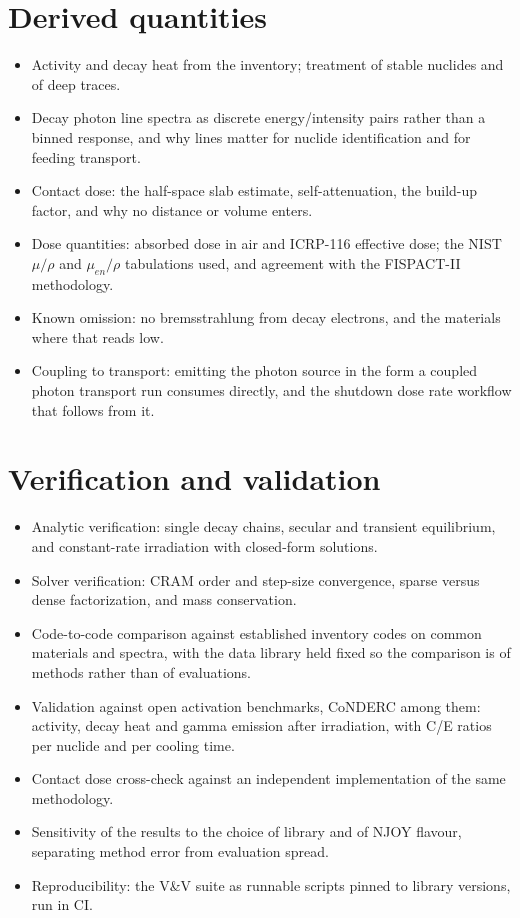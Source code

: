 \section{Derived quantities}
\begin{itemize}
  \item Activity and decay heat from the inventory; treatment of stable
        nuclides and of deep traces.
  \item Decay photon line spectra as discrete energy/intensity pairs rather
        than a binned response, and why lines matter for nuclide
        identification and for feeding transport.
  \item Contact dose: the half-space slab estimate, self-attenuation, the
        build-up factor, and why no distance or volume enters.
  \item Dose quantities: absorbed dose in air and ICRP-116 effective dose;
        the NIST $\mu/\rho$ and $\mu_{en}/\rho$ tabulations used, and
        agreement with the FISPACT-II methodology.
  \item Known omission: no bremsstrahlung from decay electrons, and the
        materials where that reads low.
  \item Coupling to transport: emitting the photon source in the form a
        coupled photon transport run consumes directly, and the shutdown
        dose rate workflow that follows from it.
\end{itemize}

\section{Verification and validation}
\begin{itemize}
  \item Analytic verification: single decay chains, secular and transient
        equilibrium, and constant-rate irradiation with closed-form
        solutions.
  \item Solver verification: CRAM order and step-size convergence, sparse
        versus dense factorization, and mass conservation.
  \item Code-to-code comparison against established inventory codes on
        common materials and spectra, with the data library held fixed so
        the comparison is of methods rather than of evaluations.
  \item Validation against open activation benchmarks, CoNDERC among them:
        activity, decay heat and gamma emission after irradiation, with
        C/E ratios per nuclide and per cooling time.
  \item Contact dose cross-check against an independent implementation of
        the same methodology.
  \item Sensitivity of the results to the choice of library and of NJOY
        flavour, separating method error from evaluation spread.
  \item Reproducibility: the V\&V suite as runnable scripts pinned to
        library versions, run in CI.
\end{itemize}

